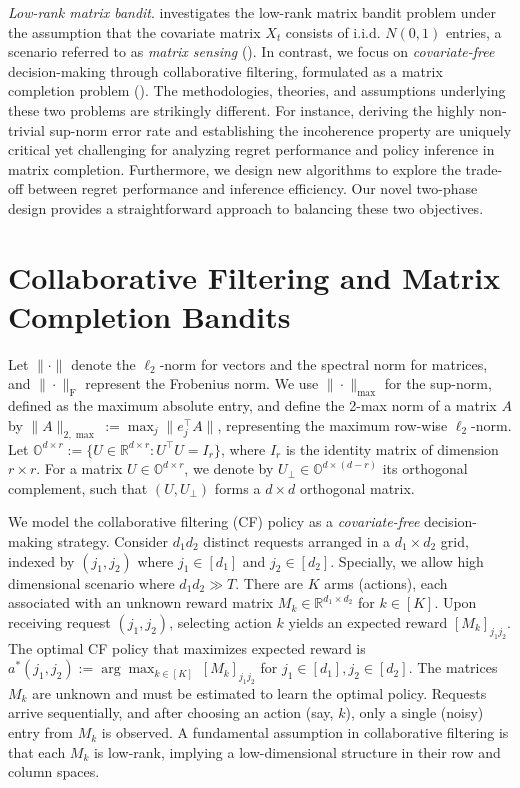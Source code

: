 \documentclass[12pt]{article}
\def\OO{{\mathbb O}}
\def\RR{{\mathbb R}}
\theoremstyle{plain}
\begin{document}
\emph{Low-rank matrix bandit}.  \cite{han2022online} investigates the low-rank matrix bandit problem under the assumption that the covariate matrix $X_t$ consists of i.i.d. $N(0,1)$ entries, a scenario referred to as \emph{matrix sensing} (\cite{candes2011tight}). In contrast, we focus on \emph{covariate-free} decision-making through collaborative filtering, formulated as a \emph{}matrix completion problem (\cite{candes2012exact}). The methodologies, theories, and assumptions underlying these two problems are strikingly different.
For instance, deriving the highly non-trivial sup-norm error rate and establishing the incoherence property are uniquely critical yet challenging for analyzing regret performance and policy inference in matrix completion. Furthermore, we design new algorithms to explore the trade-off between regret performance and inference efficiency. Our novel two-phase design provides a straightforward approach to balancing these two objectives. 


\section{Collaborative Filtering and Matrix Completion Bandits}\label{sec:CF-policy}
Let $\|\cdot\|$ denote the $\ell_2$-norm for vectors and the spectral norm for matrices, and $\|\cdot\|_{\mathrm{F}}$ represent the Frobenius norm. We use $\|\cdot\|_{\max}$ for the sup-norm, defined as the maximum absolute entry, and define the 2-max norm of a matrix $A$ by $\|A\|_{2,\max} := \max_{j} \|e_j^{\top}A\|$, representing the maximum row-wise $\ell_2$-norm. Let $\OO^{d \times r} := \big\{U \in \mathbb{R}^{d \times r} : U^{\top}U = I_{r}\big\}$, where $I_{r}$ is the identity matrix of dimension $r\times r$. For a matrix $U \in \OO^{d \times r}$, we denote by $U_{\perp} \in \OO^{d \times (d-r)}$ its orthogonal complement, such that $(U, U_{\perp})$ forms a $d\times d$ orthogonal matrix.

We model the collaborative filtering (CF) policy as a \emph{covariate-free} decision-making strategy. Consider $d_1d_2$ distinct requests arranged in a $d_1 \times d_2$ grid, indexed by $(j_1, j_2)$ where $j_1 \in [d_1]$ and $j_2 \in [d_2]$. Specially, we allow high dimensional scenario where $d_1d_2\gg T$. There are $K$ arms (actions), each associated with an unknown reward matrix $M_k\in\RR^{d_1\times d_2}$ for $k \in [K]$. Upon receiving request $(j_1, j_2)$, selecting action $k$ yields an expected reward $[M_k]_{j_1j_2}$. The optimal CF policy that maximizes expected reward is
$a^{\ast}(j_1, j_2) := \arg\max_{k\in[K]} \ [M_k]_{j_1j_2}$ for $j_1 \in [d_1], j_2 \in [d_2].$
The matrices $M_k$ are unknown and must be estimated to learn the optimal policy.  Requests arrive sequentially, and after choosing an action (say, $k$), only a single (noisy) entry from $M_k$ is observed. A fundamental assumption in collaborative filtering is that each $M_k$ is low-rank, implying a low-dimensional structure in their row and column spaces. 
\end{document}

